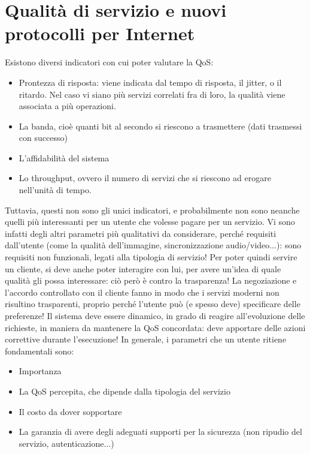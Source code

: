 \chapter{Qualità di servizio e nuovi protocolli per Internet}
Esistono diversi indicatori con cui poter valutare la QoS:
\begin{itemize}
 \item Prontezza di risposta: viene indicata dal tempo di risposta, il jitter, o
il ritardo. Nel caso vi siano più
servizi correlati fra di loro, la qualità viene associata a più operazioni.
 \item La banda, cioè quanti bit al secondo si riescono a trasmettere (dati
trasmessi con successo)
 \item L'affidabilità del sistema
 \item Lo throughput, ovvero il numero di servizi che si riescono ad erogare
nell'unità di tempo.
\end{itemize}
Tuttavia, questi non sono gli unici indicatori, e probabilmente non sono neanche
quelli più interessanti per un utente
che volesse pagare per un servizio. Vi sono infatti degli altri parametri più
qualitativi da considerare, perché
requisiti dall'utente (come la qualità dell'immagine, sincronizzazione
audio/video...): sono requisiti non funzionali,
legati alla tipologia di servizio! Per poter quindi servire un cliente, si deve
anche poter interagire con lui, per
avere un'idea di quale qualità gli possa interessare: ciò però è contro la
trasparenza! La negoziazione e l'accordo
controllato con il cliente fanno in modo che i servizi moderni non risultino
trasparenti, proprio perché l'utente può
(e spesso deve) specificare delle preferenze! Il sistema deve essere dinamico,
in grado di reagire all'evoluzione
delle richieste, in maniera da mantenere la QoS concordata: deve apportare delle
azioni correttive durante l'esecuzione!
In generale, i parametri che un utente ritiene fondamentali sono:
\begin{itemize}
 \item Importanza
 \item La QoS percepita, che dipende dalla tipologia del servizio
 \item Il costo da dover sopportare
 \item La garanzia di avere degli adeguati supporti per la sicurezza (non
ripudio del servizio, autenticazione...)
\end{itemize}


